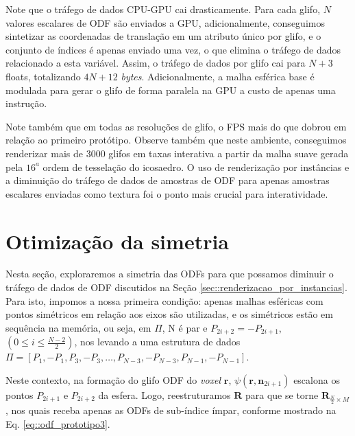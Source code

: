 \documentclass[
    12pt,                %
    oneside,            %
    a4paper,            %
    english,            %
    french,                %
    spanish,            %
    brazil                %
    ]{abntex2}
\begin{document}
Note que o tráfego de dados CPU-GPU cai drasticamente. Para cada glifo, $N$ valores escalares de ODF são enviados a GPU, adicionalmente, conseguimos sintetizar as coordenadas de translação em um atributo único por glifo, e o conjunto de índices é apenas enviado uma vez, o que elimina o tráfego de dados relacionado a esta variável. Assim, o tráfego de dados por glifo cai para $N + 3$ floats, totalizando $4N + 12$ \textit{bytes}. Adicionalmente, a malha esférica base é modulada para gerar o glifo de forma paralela na GPU a custo de apenas uma instrução.

Note também que em todas as resoluções de glifo, o FPS mais do que dobrou em relação ao primeiro protótipo. Observe também que neste ambiente, conseguimos renderizar mais de 3000 glifos em taxas interativa \cite{nielsen1994} a partir da malha suave gerada pela $16^a$ ordem de tesselação do icosaedro. O uso de renderização por instâncias e a diminuição do tráfego de dados de amostras de ODF para apenas amostras escalares enviadas como textura foi o ponto mais crucial para interatividade.

\section{Otimização da simetria}
\label{sec::otimizacao_da_simetria}

Nesta seção, exploraremos a simetria das ODFs para que possamos diminuir o tráfego de dados de ODF discutidos na Seção \ref{sec::renderizacao_por_instancias}. Para isto, impomos a nossa primeira condição: apenas malhas esféricas com pontos simétricos em relação aos eixos são utilizadas, e os simétricos estão em sequência na memória, ou seja, em $\Pi$, N é par e $P_{2i+2} = -P_{2i+1}$, $(0 \leq i \leq \frac{N-2}{2})$, nos levando a uma estrutura de dados $\Pi = [P_1, -P_1, P_3, -P_3, \dots, P_{N-3}, -P_{N-3}, P_{N-1}, -P_{N-1}]$.

Neste contexto, na formação do glifo ODF do \textit{voxel} $\mathbf{r}$, $\psi(\mathbf{r}, \mathbf{n}_{2i+1})$ escalona os pontos $P_{2i+1}$ e $P_{2i+2}$ da esfera. Logo, reestruturamos $\mathbf{R}$ para que se torne $\mathbf{R}_{\frac{N}{2}\times M}$, nos quais receba apenas as ODFs de sub-índice ímpar, conforme mostrado na Eq. \ref{eq::odf_prototipo3}.
\end{document}
